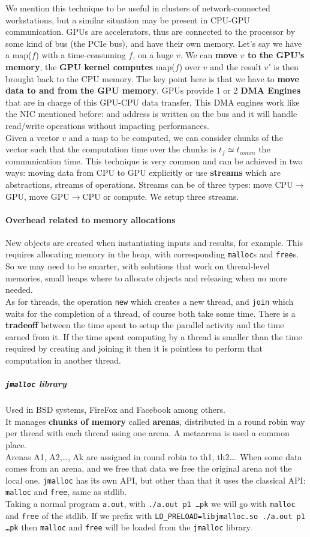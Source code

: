 \documentclass[10pt]{report}
\begin{document}
We mention this technique to be useful in clusters of network-connected workstations, but a similar situation may be present in CPU-GPU communication. GPUs are accelerators, thus are connected to the processor by some kind of bus (the PCIe bus), and have their own memory. Let's say we have a map($f$) with a time-consuming $f$, on a huge $v$. We can \textbf{move $v$ to the GPU's memory}, the \textbf{GPU kernel computes} map($f$) over $v$ and the result $v'$ is then brought back to the CPU memory. The key point here is that we have to \textbf{move data to and from the GPU memory}. GPUs provide 1 or 2 \textbf{DMA Engines} that are in charge of this GPU-CPU data transfer. This DMA engines work like the NIC mentioned before: and address is written on the bus and it will handle read/write operations without impacting performances.\\
Given a vector $v$ and a map to be computed, we can consider chunks of the vector such that the computation time over the chunks is $t_f\simeq t_{comm}$ the communication time. This technique is very common and can be achieved in two ways: moving data from CPU to GPU explicitly or use \textbf{streams} which are abstractions, streams of operations. Streams can be of three types: move CPU$\rightarrow$GPU, move GPU$\rightarrow$CPU or compute. We setup three streams.
\paragraph{Overhead related to memory allocations} New objects are created when instantiating inputs and results, for example. This requires allocating memory in the heap, with corresponding \texttt{malloc}s and \texttt{free}s. So we may need to be smarter, with solutions that work on thread-level memories, small heaps where to allocate objects and releasing when no more needed.\\
As for threads, the operation \texttt{new} which creates a new thread, and \texttt{join} which waits for the completion of a thread, of course both take some time. There is a \textbf{tradeoff} between the time spent to setup the parallel activity and the time earned from it. If the time spent computing by a thread is smaller than the time required by creating and joining it then it is pointless to perform that computation in another thread.
\subparagraph{\texttt{jmalloc} library} Used in BSD systems, FireFox and Facebook among others.\\
It manages \textbf{chunks of memory} called \textbf{arenas}, distributed in a round robin way per thread with each thread using one arena. A metaarena is used a common place.\\
Arenas A1, A2,\ldots, Ak are assigned in round robin to th1, th2\ldots. When some data comes from an arena, and we free that data we free the original arena not the local one. \texttt{jmalloc} has its own API, but other than that it uses the classical API: \texttt{malloc} and \texttt{free}, same as stdlib.\\
Taking a normal program \texttt{a.out}, with \texttt{./a.out p1 \ldots pk} we will go with \texttt{malloc} and \texttt{free} of the stdlib. If we prefix with \texttt{LD\_PRELOAD=libjmalloc.so ./a.out p1 \ldots pk} then \texttt{malloc} and \texttt{free} will be loaded from the \texttt{jmalloc} library.
\end{document}
